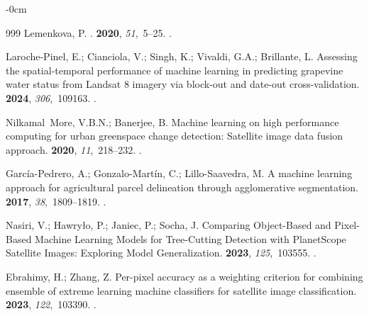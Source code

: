 \documentclass[geomatics,article,accept,pdftex,oneauthor]{Definitions/mdpi}
\begin{document}
\begin{adjustwidth}{-\extralength}{0cm}
\begin{thebibliography}{999}
Lemenkova, P.
.
 {\bf 2020}, {\em 51},~5--25.
.

Laroche-Pinel, E.; Cianciola, V.; Singh, K.; Vivaldi, G.A.; Brillante, L.
\newblock Assessing the spatial-temporal performance of machine learning in
  predicting grapevine water status from Landsat 8 imagery via block-out and
  date-out cross-validation.
 {\bf 2024}, {\em 306},~109163.
.

Nilkamal~More, V.B.N.; Banerjee, B.
\newblock Machine learning on high performance computing for urban greenspace
  change detection: Satellite image data fusion approach.
 {\bf 2020}, {\em
  11},~218--232.
.

García-Pedrero, A.; Gonzalo-Martín, C.; Lillo-Saavedra, M.
\newblock A machine learning approach for agricultural parcel delineation
  through agglomerative segmentation.
 {\bf 2017}, {\em
  38},~1809--1819.
.

Nasiri, V.; Hawryło, P.; Janiec, P.; Socha, J.
\newblock Comparing Object-Based and Pixel-Based Machine Learning Models for
  Tree-Cutting Detection with PlanetScope Satellite Images: Exploring Model
  Generalization.
 {\bf 2023}, {\em 125},~103555.
.

Ebrahimy, H.; Zhang, Z.
\newblock Per-pixel accuracy as a weighting criterion for combining ensemble of
  extreme learning machine classifiers for satellite image classification.
 {\bf 2023}, {\em 122},~103390.
.


\end{thebibliography}
\end{adjustwidth}
\end{document}
